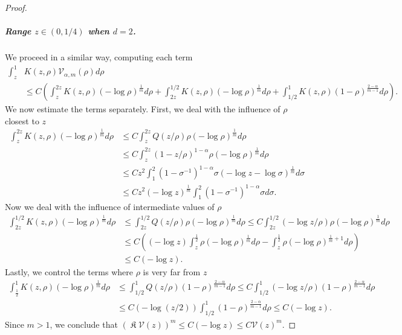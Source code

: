 \documentclass[a4paper]{article}
\theoremstyle{definition}
\DeclareMathOperator{\fixedpoint}{\mathfrak K}
\begin{document}
\begin{proof}
\subparagraph{Range $z \in (0,1/4)$ when $d = 2$.}
We proceed in a similar way, computing each term
\begin{align*}
  \int_z^1 & K(z,\rho) \mathcal V_{\alpha,m} (\rho) d \rho
  \\
  & \le C \left( \int_z^{2z}  K(z, \rho) (-\log \rho)^{\frac 1 m} d \rho + \int_{2z}^{1/2}   K(z, \rho) (-\log \rho) ^{\frac 1 m}d \rho + \int_{1/2}^{1}  K(z, \rho) (1-\rho)^{\frac{2-\alpha}{m-1}} d \rho \right).
\end{align*}
We now estimate the terms separately. First, we deal with the influence of $\rho$ closest to $z$
\begin{align*}
  \int_z^{2z}  K(z, \rho) (-\log \rho)^{\frac 1 m} d \rho
  & \le C \int_z^{2z}  Q(z/ \rho) \rho(-\log \rho)^{\frac 1 m} d \rho
  \\
  & \le C  \int_z^{2z}  (1 - z/\rho)^{1-\alpha}  \rho(-\log \rho)^{\frac 1 m} d \rho
  \\
  & \le C z^2 \int_1^{2}  (1 - \sigma^{-1})^{1-\alpha}  \sigma (-\log z - \log \sigma)^{\frac 1 m} d \sigma
  \\
  & \le  C z^2 (-\log z)^{\frac 1 m} \int_1^{2}  (1 - \sigma^{-1})^{1-\alpha}  \sigma  d \sigma.
\end{align*}
Now we deal with the influence of intermediate values of $\rho$
\begin{align*}
  \int_{2z}^{1/2}  K(z, \rho) (-\log \rho)^{\frac 1 m} d \rho
  & \le \int_{2z}^{1/2}   Q(z/\rho) \rho(-\log \rho)^{\frac 1 m} d \rho
  \le C \int_{2z}^{1/2}(-\log z/\rho)\rho(-\log \rho)^{\frac 1 m} d \rho
  \\
  & \le C\left( (-\log z) \int_{z}^{\frac 1 2} \rho (-\log \rho)^{\frac 1 m} d\rho -   \int_{z}^{\frac 1 2} \rho (-\log \rho)^{\frac 1 m + 1}d\rho \right)
  \\
  & \le C (-\log z).
\end{align*}
Lastly, we control the terms where $\rho$ is very far from $z$
\begin{align*}
  \int_{\frac 1 2}^{1}  K(z, \rho) (-\log \rho)^{\frac 1 m} d \rho
  & \le \int_{1/2}^{1}  Q(z/\rho) (1-\rho)^{\frac{2-\alpha}{m-1}} d \rho
  \le C \int_{1/2}^{1} (-\log z/\rho) (1-\rho)^{\frac{2-\alpha}{m-1}} d \rho
  \\
  & 
  \le  C (-\log (z/2)) \int_{1/2}^{1} (1-\rho)^{\frac{2-\alpha}{m-1}} d \rho
  \le C (-\log z).
\end{align*}
Since $m > 1$, we conclude that $(\fixedpoint\mathcal V (z))^{m} \le C (-\log z) \le C \mathcal V(z)^m$. 
\end{proof}
\end{document}

